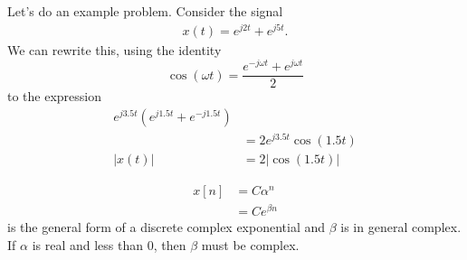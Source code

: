 Let's do an example problem. 
Consider the signal 
\begin{eqnarray}
    x(t) = e^{j2t} + e^{j5t}.
\end{eqnarray}
We can rewrite this, using 
the identity 
\begin{equation}
    \cos(\omega t) = \frac{e^{-j \omega t}+ e^{j\omega t}}{2}
\end{equation}
to the expression 
\begin{align}
    e^{j 3.5 t} (e^{j1.5t} + e^{-j 1.5 t}) \\
    &= 2 e^{j 3.5 t}\cos(1.5t) \\
    |x(t)| &= 2|\cos(1.5 t)|
\end{align}

\begin{align}
    x[n] &= C\alpha^n \\
    &= Ce^{\beta n}
\end{align}
is the general form of a discrete complex exponential and 
$\beta$ is in general complex. If $\alpha$ is real and less 
than 0, then $\beta$ must be complex. 